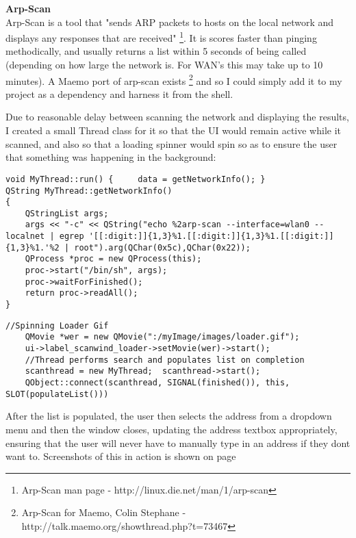 {\bf Arp-Scan}\\
Arp-Scan is a tool that "sends ARP packets to hosts on the local network and displays any responses that are received" \footnote{Arp-Scan man page - http://linux.die.net/man/1/arp-scan}\label{ref:arpscanman}. It is scores faster than pinging methodically, and usually returns a list within 5 seconds of being called (depending on how large the network is. For WAN's this may take up to 10 minutes).
A Maemo port of arp-scan exists \footnote{Arp-Scan for Maemo, Colin Stephane - http://talk.maemo.org/showthread.php?t=73467}\label{ref:arpscanmaemo} and so I could simply add it to my project as a dependency and harness it from the shell.

Due to reasonable delay between scanning the network and displaying the results, I created a small Thread class for it so that the UI would remain active while it scanned, and also so that a loading spinner would spin so as to ensure the user that something was happening in the background:
\vspace{-15pt}
\begin{lstlisting}[title=\bf Snippet from MyThread.cpp for Scanning network and Retrieving data]
void MyThread::run() {     data = getNetworkInfo(); }
QString MyThread::getNetworkInfo()
{
    QStringList args;
    args << "-c" << QString("echo %2arp-scan --interface=wlan0 --localnet | egrep '[[:digit:]]{1,3}%1.[[:digit:]]{1,3}%1.[[:digit:]]{1,3}%1.'%2 | root").arg(QChar(0x5c),QChar(0x22));
    QProcess *proc = new QProcess(this);
    proc->start("/bin/sh", args);
    proc->waitForFinished();
    return proc->readAll();
}
\end{lstlisting}
\vspace{-20pt}
\begin{lstlisting}[title=\bf Snippet from ScanWind.cpp which calls MyThread]
    //Spinning Loader Gif
    QMovie *wer = new QMovie(":/myImage/images/loader.gif");
    ui->label_scanwind_loader->setMovie(wer)->start();
    //Thread performs search and populates list on completion
    scanthread = new MyThread;  scanthread->start();
    QObject::connect(scanthread, SIGNAL(finished()), this, SLOT(populateList()))
\end{lstlisting}

After the list is populated, the user then selects the address from a dropdown menu and then the window closes, updating the address textbox appropriately, ensuring that the user will never have to manually type in an address if they dont want to. Screenshots of this in action is shown on page~\pageref{guimap}


